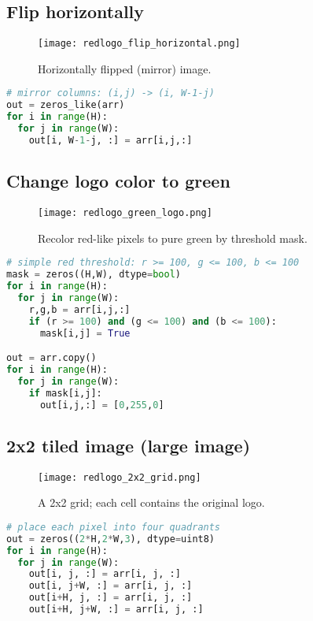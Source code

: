 \documentclass[11pt,a4paper]{article}
\begin{document}
\clearpage
\subsection{Flip horizontally}
\begin{figure}[H]
  \centering
  \texttt{[image: redlogo\_flip\_horizontal.png]}
  \caption{Horizontally flipped (mirror) image.}
\end{figure}
\begin{lstlisting}[language=Python, caption=Manual horizontal flip snippet]
# mirror columns: (i,j) -> (i, W-1-j)
out = zeros_like(arr)
for i in range(H):
  for j in range(W):
    out[i, W-1-j, :] = arr[i,j,:]
\end{lstlisting}

\clearpage
\subsection{Change logo color to green}
\begin{figure}[H]
  \centering
  \texttt{[image: redlogo\_green\_logo.png]}
  \caption{Recolor red-like pixels to pure green by threshold mask.}
\end{figure}
\begin{lstlisting}[language=Python, caption=Manual recolor-to-green snippet]
# simple red threshold: r >= 100, g <= 100, b <= 100
mask = zeros((H,W), dtype=bool)
for i in range(H):
  for j in range(W):
    r,g,b = arr[i,j,:]
    if (r >= 100) and (g <= 100) and (b <= 100):
      mask[i,j] = True

out = arr.copy()
for i in range(H):
  for j in range(W):
    if mask[i,j]:
      out[i,j,:] = [0,255,0]
\end{lstlisting}

\clearpage
\subsection{2x2 tiled image (large image)}
\begin{figure}[H]
  \centering
  \texttt{[image: redlogo\_2x2\_grid.png]}
  \caption{A 2x2 grid; each cell contains the original logo.}
\end{figure}
\begin{lstlisting}[language=Python, caption=Manual 2x2 tile snippet]
# place each pixel into four quadrants
out = zeros((2*H,2*W,3), dtype=uint8)
for i in range(H):
  for j in range(W):
    out[i, j, :] = arr[i, j, :]
    out[i, j+W, :] = arr[i, j, :]
    out[i+H, j, :] = arr[i, j, :]
    out[i+H, j+W, :] = arr[i, j, :]
\end{lstlisting}
\end{document}
